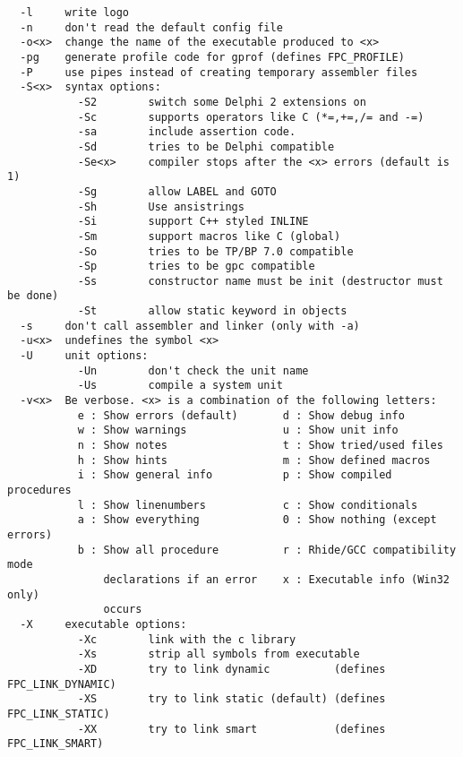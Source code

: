 \documentclass{book}
\begin{document}
\begin{verbatim}
  -l     write logo
  -n     don't read the default config file
  -o<x>  change the name of the executable produced to <x>
  -pg    generate profile code for gprof (defines FPC_PROFILE)
  -P     use pipes instead of creating temporary assembler files
  -S<x>  syntax options:
           -S2        switch some Delphi 2 extensions on
           -Sc        supports operators like C (*=,+=,/= and -=)
           -sa        include assertion code.
           -Sd        tries to be Delphi compatible
           -Se<x>     compiler stops after the <x> errors (default is 1)
           -Sg        allow LABEL and GOTO
           -Sh        Use ansistrings
           -Si        support C++ styled INLINE
           -Sm        support macros like C (global)
           -So        tries to be TP/BP 7.0 compatible
           -Sp        tries to be gpc compatible
           -Ss        constructor name must be init (destructor must be done)
           -St        allow static keyword in objects
  -s     don't call assembler and linker (only with -a)
  -u<x>  undefines the symbol <x>
  -U     unit options:
           -Un        don't check the unit name
           -Us        compile a system unit
  -v<x>  Be verbose. <x> is a combination of the following letters:
           e : Show errors (default)       d : Show debug info
           w : Show warnings               u : Show unit info
           n : Show notes                  t : Show tried/used files
           h : Show hints                  m : Show defined macros
           i : Show general info           p : Show compiled procedures
           l : Show linenumbers            c : Show conditionals
           a : Show everything             0 : Show nothing (except errors)
           b : Show all procedure          r : Rhide/GCC compatibility mode
               declarations if an error    x : Executable info (Win32 only)
               occurs
  -X     executable options:
           -Xc        link with the c library
           -Xs        strip all symbols from executable
           -XD        try to link dynamic          (defines FPC_LINK_DYNAMIC)
           -XS        try to link static (default) (defines FPC_LINK_STATIC)
           -XX        try to link smart            (defines FPC_LINK_SMART)


\end{verbatim}
\end{document}

